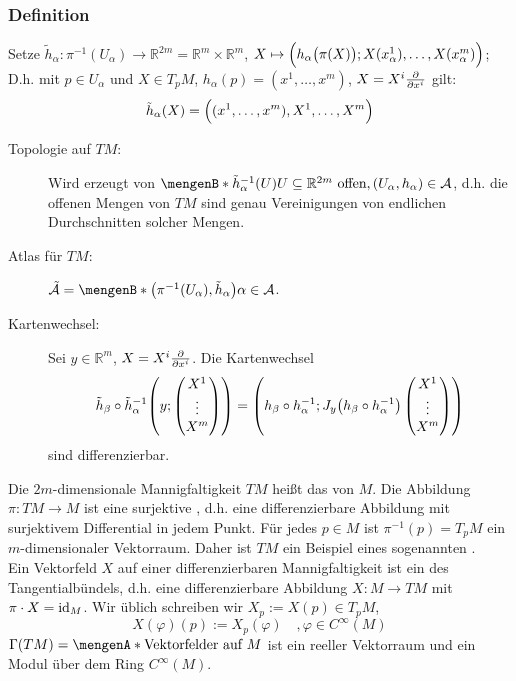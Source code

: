 \subsubsection[Definition: Tangentialbündel]{Definition} %
\label{ssub:411}
Setze $\tilde{h}_\alpha : \pi ^{-1}(U_\alpha) \to \mathds{R}^{2m}= \mathds{R}^m \times \mathds{R}^m$, 
$X \mapsto \enbrace[\Big]{h_\alpha \enbrace[\big]{\pi(X)}; X(x_\alpha^1), \ldots , X(x_\alpha^m)}$; 
D.h. mit $p \in U_\alpha$ und $X \in T_pM$, $h_\alpha(p)= (x^1, \ldots , x^m)$, $X= X^i \diff{}{x^i} $ gilt:
\[
	\tilde{h}_\alpha(X) = \enbrace[\Big]{(x^1, \ldots , x^m), X^1, \ldots , X^m} 
\]
\begin{description}
	\item[Topologie auf $TM$:] Wird erzeugt von $\set[\tilde{h}_\alpha ^{-1}(U)]{U \subseteq \mathds{R}^{2m} \text{ offen}, (U_\alpha, h_\alpha) \in \mathcal{A}}$,
	d.h. die offenen Mengen von $TM$ sind genau Vereinigungen von endlichen Durchschnitten solcher Mengen. 
	\item[Atlas für $TM$:] $\tilde{\mathcal{A}} = \set[\enbrace*{\pi ^{-1}(U_\alpha), \tilde{h}_\alpha} ]{\alpha \in \mathcal{A}}$.
	\item[Kartenwechsel:] Sei $y \in \mathds{R}^m$, $X= X^i \diff{}{x^i}$. Die Kartenwechsel
	\[
		\tilde{h}_\beta \circ \tilde{h}_\alpha ^{-1} \enbrace*{y; \begin{pmatrix}
			X^1 \\
			\vdots \\
			X^m
		\end{pmatrix}} = \enbrace*{h_\beta \circ h_\alpha ^{-1}; J_y \enbrace*{h_\beta \circ  h_\alpha ^{-1}} \begin{pmatrix}
			X^1 \\
			\vdots \\
			X^m
		\end{pmatrix} } 
	\]
	sind differenzierbar.
\end{description}
Die $2m$-dimensionale Mannigfaltigkeit $TM$ heißt das  von $M$. Die Abbildung $\pi : TM  \to M$ ist eine surjektive , d.h. eine
differenzierbare Abbildung mit surjektivem Differential in jedem Punkt. Für jedes $p \in M$ ist $\pi ^{-1}(p)= T_p M$ ein $m$-dimensionaler Vektorraum. Daher ist $TM$
ein Beispiel eines sogenannten .\\
Ein Vektorfeld $X$ auf einer differenzierbaren Mannigfaltigkeit ist ein  des Tangentialbündels, d.h. eine differenzierbare Abbildung $X: M \to TM$ mit 
$\pi \cdot X = \id_M$. Wir üblich schreiben wir $X_p := X(p) \in T_pM$,
\[
	X(\varphi)(p) := X_p(\varphi) \quad , \varphi \in C^\infty(M)
\]
$\Gamma(TM) = \set{\text{Vektorfelder auf }M}$ ist ein reeller Vektorraum und ein Modul über dem Ring $C^\infty(M)$.
